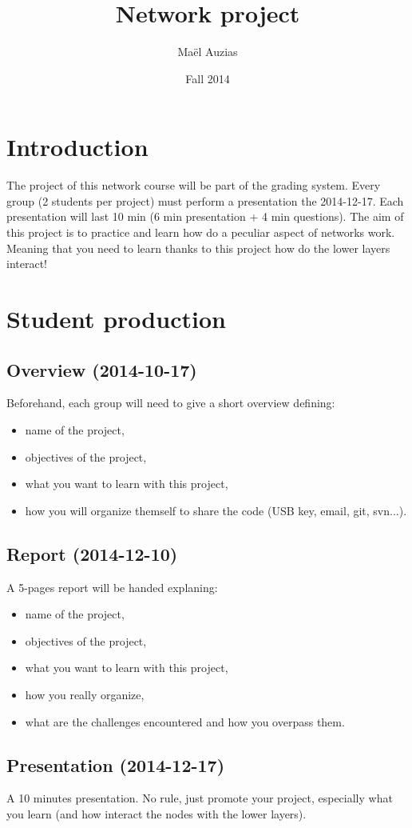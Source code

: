 \documentclass[11pt]{article}
\begin{document}
 
\title{Network project}
\date{Fall 2014}
\author{Maël Auzias}
\maketitle

\section{Introduction}
The project of this network course will be part of the grading system. Every group (2 students per project) must perform a presentation the 2014-12-17. Each presentation will last 10 min (6 min presentation + 4 min questions).
The aim of this project is to practice and learn how do a peculiar aspect of networks work. Meaning that you need to learn thanks to this project how do the lower layers interact!

\section{Student production}
\subsection{Overview (2014-10-17)}
Beforehand, each group will need to give a short overview defining:
  \begin{itemize}
    \item name of the project,
    \item objectives of the project,
    \item what you want to learn with this project,
    \item how you will organize themself to share the code (USB key, email, git, svn...).
  \end{itemize}
\subsection{Report (2014-12-10)}
A 5-pages report will be handed explaning:
  \begin{itemize}
    \item name of the project,
    \item objectives of the project,
    \item what you want to learn with this project,
    \item how you really organize,
    \item what are the challenges encountered and how you overpass them.
  \end{itemize}
\subsection{Presentation (2014-12-17)}
A 10 minutes presentation. No rule, just promote your project, especially what you learn (and how interact the nodes with the lower layers).
\end{document}

